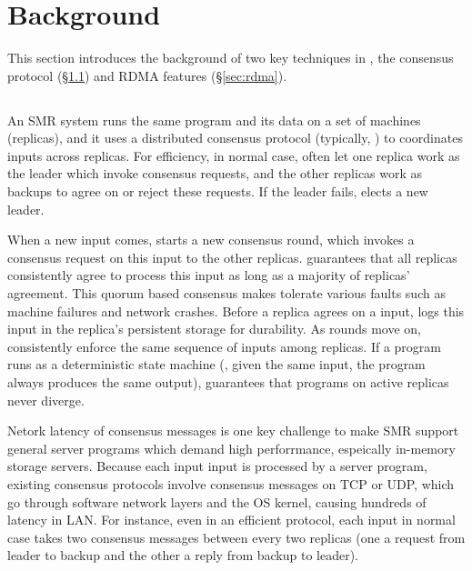 \section{\xxx Background}\label{sec:background}

This section introduces the background of two key techniques in \xxx, the 
\paxos consensus protocol (\S\ref{sec:paxos}) and RDMA features 
(\S\ref{sec:rdma}).

\subsection{\paxos}\label{sec:paxos}
An SMR system runs the same program and its data on a set of machines 
(replicas), and it uses a distributed consensus protocol (typically, \paxos) 
to coordinates inputs across replicas. For efficiency, in normal case, \paxos 
often let one replica work as the leader which invoke consensus requests, and 
the other replicas work as backups to agree on or reject these requests. If 
the leader fails, \paxos elects a new leader.

When a new input comes, \paxos starts a new consensus round, which invokes a 
consensus request on this input to the other replicas. \paxos guarantees that 
all replicas consistently agree to process this input as long as a majority of 
replicas' agreement. This quorum based consensus makes \paxos tolerate various 
faults such as machine failures and network crashes. Before a replica agrees on 
a input, \paxos logs this input in the replica's persistent storage for 
durability. As rounds move on, \paxos consistently enforce the same sequence of 
inputs among replicas. If a program runs as a deterministic state machine (\ie, 
given the same input, the program always produces the same output), \paxos 
guarantees that programs on active replicas never diverge.

Netork latency of consensus messages is one key challenge to make SMR support 
general server programs which demand high perforrmance, espeically in-memory 
storage servers. Because each input input is processed by a server program, 
existing consensus protocols involve consensus messages on TCP or UDP, which go 
through software network layers and the OS kernel, causing hundreds of \us 
latency in LAN. For instance, even in an efficient \paxos protocol, each input 
in normal case takes two consensus messages between every two replicas (one a 
request from leader to backup and the other a reply from backup to leader).


